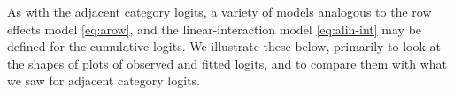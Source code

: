As with the adjacent category logits, a variety of models analogous to
the row effects model \eqref{eq:arow}, and
the linear-interaction model \eqref{eq:alin-int}
may be defined for the cumulative logits.
We illustrate these below, primarily to look at the shapes of plots
of observed and fitted logits, and to compare them with what we saw for
adjacent category logits.

